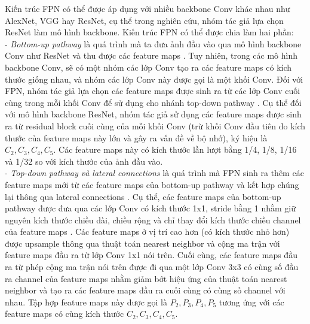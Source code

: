 {    \noindent
    Kiến trúc FPN  có thể được áp dụng với nhiều backbone  Conv khác nhau như AlexNet, VGG hay ResNet, cụ thể trong nghiên cứu, nhóm tác giả lựa chọn ResNet làm mô hình backbone.
    Kiến trúc FPN  có thể được chia làm hai phần: \\
    - \textit{Bottom-up pathway}  là quá trình mà ta đưa ảnh đầu vào qua mô hình backbone  Conv như ResNet và thu được các feature maps .
    Tuy nhiên, trong các mô hình backbone  Conv, sẽ có một nhóm các lớp Conv  tạo ra các feature maps  có kích thước giống nhau, và nhóm các lớp Conv  này được gọi là một khối Conv.
    Đối với FPN, nhóm tác giả lựa chọn các feature maps  được sinh ra từ các lớp Conv  cuối cùng trong mỗi khối Conv để sử dụng cho nhánh top-down pathway .
    Cụ thể đối với mô hình backbone  ResNet, nhóm tác giả sử dụng các feature maps  được sinh ra từ residual block cuối cùng của mỗi khối Conv (trừ khối Conv đầu tiên do kích thước của feature maps  này lớn và gây ra vấn đề về bộ nhớ), ký hiệu là \textit{{${C}_{2}, {C}_{3}, {C}_{4}, {C}_{5}$}}.
    Các feature maps  này có kích thước lần lượt bằng 1/4, 1/8, 1/16 và 1/32 so với kích thước của ảnh đầu vào. \\
    - \textit{Top-down pathway và lateral connections}   là quá trình mà FPN  sinh ra thêm các feature maps  mới từ các feature maps  của bottom-up pathway  và kết hợp chúng lại thông qua lateral connections .
    Cụ thể, các feature maps  của bottom-up pathway  được đưa qua các lớp Conv  có kích thước 1x1, stride  bằng 1 nhằm giữ nguyên kích thước chiều dài, chiều rộng và chỉ thay đổi kích thước chiều channel  của feature maps .
    Các feature maps  ở vị trí cao hơn (có kích thước nhỏ hơn) được upsample  thông qua thuật toán nearest neighbor  và cộng ma trận với feature maps  đầu ra từ lớp Conv  1x1 nói trên.
    Cuối cùng, các feature maps  đầu ra từ phép cộng ma trận nói trên được đi qua một lớp Conv  3x3 có cùng số đầu ra channel  của feature maps  nhằm giảm bớt hiệu ứng của thuật toán nearest neighbor  và tạo ra các feature maps  đầu ra cuối cùng có cùng số channel  với nhau.
    Tập hợp feature maps  này được gọi là \textit{{${P}_{2}, {P}_{3}, {P}_{4}, {P}_{5}$}} tương ứng với các feature maps  có cùng kích thước \textit{{${C}_{2}, {C}_{3}, {C}_{4}, {C}_{5}$}}.

}
